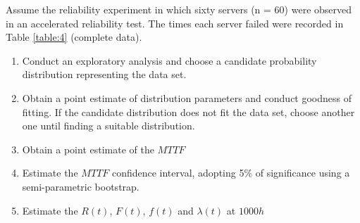 \documentclass{article}
\begin{document}
\begin{question}
    Assume the reliability experiment in which sixty servers (n = 60) were observed in an accelerated reliability test. The times each server failed were recorded in Table \ref{table:4} (complete data).
    \begin{enumerate}[label=(\alph*)]
        \item Conduct an exploratory analysis and choose a candidate probability distribution representing the data set.
        \item  Obtain a point estimate of distribution parameters and conduct goodness of fitting. If the candidate distribution does not fit the data set, choose another one until finding a
              suitable distribution.
        \item  Obtain a point estimate of the $MTTF$
        \item Estimate the $MTTF$ confidence interval, adopting 5\% of significance using a semi-parametric bootstrap.
        \item  Estimate the $R(t)$, $F(t)$, $f(t)$ and $\lambda(t)$ at $1000 h$
    \end{enumerate}

\end{question}
\end{document}
